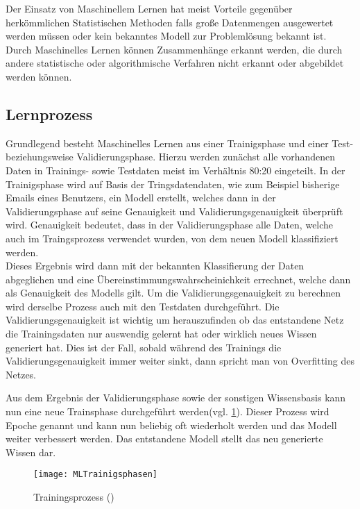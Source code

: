     Der Einsatz von Maschinellem Lernen hat meist Vorteile gegenüber herkömmlichen Statistischen Methoden falls große Datenmengen ausgewertet werden müssen
    oder kein bekanntes Modell zur Problemlösung bekannt ist.
    Durch Maschinelles Lernen können Zusammenhänge erkannt werden, die durch andere statistische oder algorithmische Verfahren nicht erkannt oder abgebildet werden können.

    \subsection{Lernprozess} \label{Lernprozess}
    Grundlegend besteht Maschinelles Lernen aus einer Trainigsphase und einer Test- beziehungsweise Validierungsphase.
    Hierzu werden zunächst alle vorhandenen Daten in Trainings- sowie Testdaten meist im Verhältnis 80:20 eingeteilt.
    In der Trainigsphase wird auf Basis der Tringsdatendaten, wie zum Beispiel bisherige Emails eines Benutzers, ein Modell erstellt, welches dann in der Validierungsphase auf seine Genauigkeit und Validierungsgenauigkeit überprüft wird.
    Genauigkeit bedeutet, dass in der Validierungsphase alle Daten, welche auch im Traingsprozess verwendet wurden, von dem neuen Modell klassifiziert werden.\\
    Dieses Ergebnis wird dann mit der bekannten Klassifierung der Daten abgeglichen und eine Übereinstimmungswahrscheinichkeit errechnet, welche dann als Genauigkeit des Modells gilt.
    Um die Validierungsgenauigkeit zu berechnen wird derselbe Prozess auch mit den Testdaten durchgeführt.
    Die Validierungsgenauigkeit ist wichtig um herauszufinden ob das entstandene Netz die Trainingsdaten nur auswendig gelernt hat oder wirklich neues Wissen generiert hat.
    Dies ist der Fall, sobald während des Trainings die Validierungsgenauigkeit immer weiter sinkt, dann spricht man von Overfitting des Netzes.
    \newline

    \noindent
    Aus dem Ergebnis der Validierungsphase sowie der sonstigen Wissensbasis kann nun eine neue Trainsphase durchgeführt werden(vgl. \ref{fig:MLTrainigsprozess}).
    Dieser Prozess wird Epoche genannt und kann nun beliebig oft wiederholt werden und das Modell weiter verbessert werden.
    Das entstandene Modell stellt das neu generierte Wissen dar.

    \begin{figure}[H]
        \centering
        \texttt{[image: MLTrainigsphasen]}
        \caption{Trainingsprozess (\cite[Figure 1-2]{HandsOnML})}
        \label{fig:MLTrainigsprozess}
    \end{figure}


